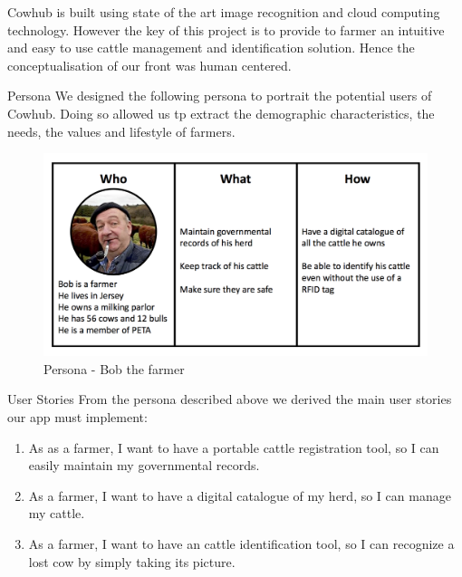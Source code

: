 %

Cowhub is built using state of the art image recognition and cloud computing technology. However the key of this project is to provide to farmer an intuitive and easy to use cattle management and identification solution. Hence the conceptualisation of our front was human centered.


\begin{subsection}{Persona}
  We designed the following persona to portrait the potential users of Cowhub. Doing so allowed us tp extract the demographic characteristics, the needs, the values and lifestyle of farmers.
  \begin{figure}[H]
  	\centering
    \includegraphics[width=1\textwidth]{images/persona.png}
  	\caption[Persona]{Persona - Bob the farmer}
  \end{figure}
\end{subsection}


\begin{subsection}{User Stories}
  From the persona described above we derived the main user stories our app must implement:
  \begin{enumerate}
    \item As as a farmer, I want to have a portable cattle registration tool, so I can easily maintain my governmental records.
    \item As a farmer, I want to have a digital catalogue of my herd, so I can manage my cattle.
    \item As a farmer, I want to have an cattle identification tool, so I can recognize a lost cow by simply taking its picture.
  \end{enumerate}
\end{subsection}

